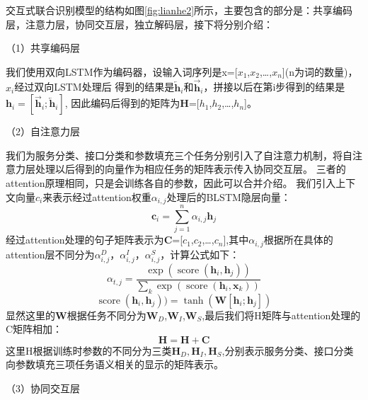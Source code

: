 交互式联合识别模型的结构如图\ref{fig:lianhe2}所示，主要包含的部分是：共享编码层，注意力层，协同交互层，独立解码层，接下将分别介绍：

（1）共享编码层

我们使用双向LSTM作为编码器，设输入词序列是x=[$x_{1}$,$x_{2}$,\dots,$x_{n}$](n为词的数量)，$x_{i}$经过双向LSTM处理后
得到的结果是$\overleftarrow{\mathbf{h}}_{i}$和$\overrightarrow{\mathbf{h}}_{i}$，拼接以后在第i步得到的结果是$\mathbf{h}_{i}=[\overrightarrow{\mathbf{h}}_{i} ;\overleftarrow{\mathbf{h}}_{i}]$,
因此编码后得到的矩阵为$\mathbf{H}$=[$h_{1}$,$h_{2}$,\dots,$h_{n}$]。

（2）自注意力层

我们为服务分类、接口分类和参数填充三个任务分别引入了自注意力机制，将自注意力层处理以后得到的向量作为相应任务的矩阵表示传入协同交互层。
三者的attention原理相同，只是会训练各自的参数，因此可以合并介绍。
我们引入上下文向量${c}_{i}$来表示经过attention权重$α_{i,j}$处理后的BLSTM隐层向量：
\begin{equation}
    \mathbf{c}_{i}=\sum_{j=1}^{n} \alpha_{i, j} \mathbf{h}_{j}
  \end{equation}
  经过attention处理的句子矩阵表示为$\mathbf{C}$=[$c_{1}$,$c_{2}$,\dots,$c_{n}$],其中$\alpha_{i, j}$根据所在具体的attention层不同分为$\alpha_{i, j}^{D}$，$\alpha_{i, j}^{I}$，$\alpha_{i, j}^{S}$，计算公式如下：
  \begin{equation}
    \alpha_{t, j}=\frac{\exp \left(\operatorname{score}\left(\mathbf{h}_{i}, \mathbf{h}_{j}\right)\right)}{\sum_{k} \exp \left(\operatorname{score}\left(\mathbf{h}_{i}, \mathbf{x}_{k}\right)\right)}
    \end{equation}
    \begin{equation}
      \operatorname{score}(\mathbf{h}_{i}, \mathbf{h}_{j}))=\tanh \left(\mathbf{W}\left[\mathbf{h}_{i} ; \mathbf{h}_{j}\right]\right)
    \end{equation}
显然这里的$\mathbf{W}$根据任务不同分为$\mathbf{W}_D$,$\mathbf{W}_I$,$\mathbf{W}_S$,最后我们将H矩阵与attention处理的C矩阵相加：
\begin{equation}
  \mathbf{H}=\mathbf{H}+\mathbf{C}
\end{equation}
这里H根据训练时参数的不同分为三类$\mathbf{H}_{D},\mathbf{H}_{I},\mathbf{H}_{S}$,分别表示服务分类、接口分类向参数填充三项任务语义相关的显示的矩阵表示。

（3）协同交互层

